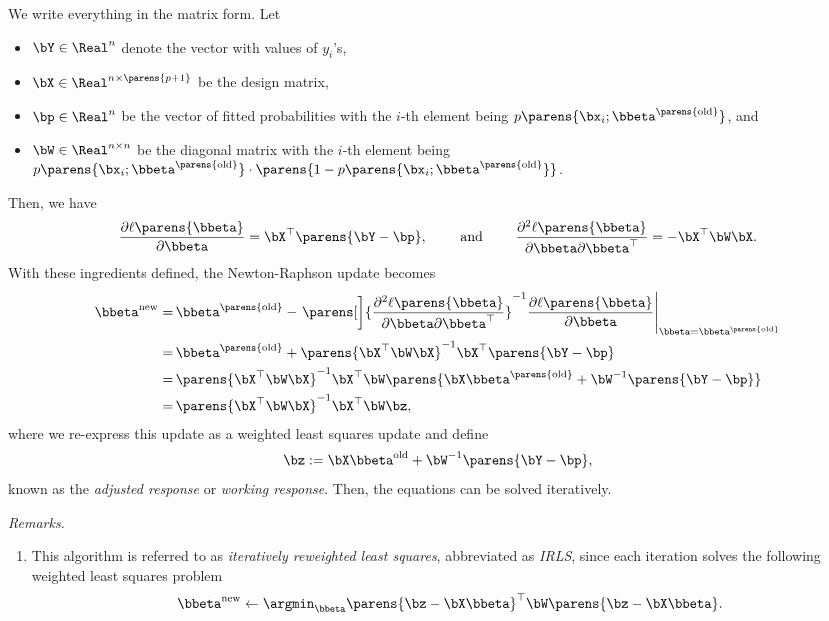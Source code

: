 \documentclass[12pt]{article}
\begin{document}
\begin{enumerate}[label=\textbf{\arabic*.}]
	We write everything in the matrix form. Let 
	\begin{itemize}
		\item $\bY \in \Real^n$ denote the vector with values of $y_i$'s, 
		\item $\bX \in \Real^{n \times \parens{p+1}}$ be the design matrix, 
		\item $\bp \in \Real^n$ be the vector of fitted probabilities with the $i$-th element being $p \parens{\bx_i; \bbeta^{\parens{\mathrm{old}}}}$, and 
		\item $\bW \in \Real^{n \times n}$ be the diagonal matrix with the $i$-th element being $p \parens{\bx_i; \bbeta^{\parens{\mathrm{old}}}} \cdot \parens{1 - p \parens{\bx_i; \bbeta^{\parens{\mathrm{old}}}}}$. 
	\end{itemize}
	Then, we have 
	\begin{align}
		\frac{\partial \ell \parens{\bbeta}}{\partial \bbeta} = \bX^\top \parens{\bY - \bp}, \qquad \text{ and } \qquad \frac{\partial^2 \ell \parens{\bbeta} }{\partial \bbeta \partial \bbeta^\top} = -\bX^\top \bW \bX. \nonumber
	\end{align}
	With these ingredients defined, the Newton-Raphson update becomes 
	\begin{align*}
		\bbeta^{\mathrm{new}} = & \, \bbeta^{\parens{\mathrm{old}}} - \left. \parens[\bigg]{\frac{\partial^2 \ell \parens{\bbeta}}{\partial \bbeta \partial \bbeta^\top}}^{-1} \frac{\partial \ell \parens{\bbeta}}{\partial \bbeta} \right\vert_{\bbeta = \bbeta^{\parens{\mathrm{old}}}} \nonumber \\ 
		= & \, \bbeta^{\parens{\mathrm{old}}} + \parens{\bX^\top \bW \bX}^{-1} \bX^\top \parens{\bY - \bp} \nonumber \\ 
		= & \, \parens{\bX^\top \bW \bX}^{-1} \bX^\top \bW \parens{\bX \bbeta^{\parens{\mathrm{old}}} + \bW^{-1} \parens{\bY - \bp}} \nonumber \\ 
		= & \, \parens{\bX^\top \bW \bX}^{-1} \bX^\top \bW \bz, 
	\end{align*}
	where we re-express this update as a weighted least squares update and define 
	\begin{align*}
		\bz := \bX \bbeta^{\mathrm{old}} + \bW^{-1} \parens{\bY - \bp}, 
	\end{align*}
	known as the \textit{adjusted response} or \textit{working response}. Then, the equations can be solved iteratively. 
	
	\textit{Remarks.} 
	\begin{enumerate}
		\item This algorithm is referred to as \textit{iteratively reweighted least squares}, abbreviated as \emph{IRLS}, since each iteration solves the following weighted least squares problem
		\begin{align*}
			\bbeta^{\mathrm{new}} \leftarrow \argmin_{\bbeta} \parens{\bz - \bX \bbeta}^\top \bW \parens{\bz - \bX \bbeta}. 
		\end{align*}
		

\end{enumerate}
\end{enumerate}
\end{document}
